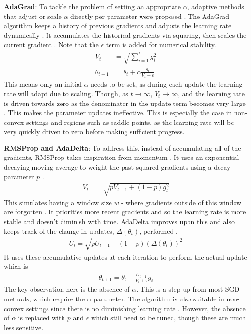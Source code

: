 \textbf{AdaGrad}: To tackle the problem of setting an appropriate $\alpha$, adaptive methods that adjust or scale $\alpha$ directly per parameter were proposed \cite{duchi2011adagrad}. The AdaGrad algorithm keeps a history of previous gradients and adjusts the learning rate dynamically \citep{duchi2011adagrad}. It accumulates the historical gradients via squaring, then scales the current gradient \citep{duchi2011adagrad}. Note that the $\epsilon$ term is added for numerical stability.
\begin{align}
    V_t &= \sqrt{\sum_{i=1}^{t} g_i^2} \\
    \theta_{t+1} &= \theta_{t} + \alpha \frac{g_t}{V_t + \epsilon}
\end{align}
This means only an initial $\alpha$ needs to be set, as during each update the learning rate will adapt due to scaling. Though, as $t \rightarrow \infty$, $V_{t} \rightarrow \infty$, and the learning rate is driven towards zero as the denominator in the update term becomes very large \citep{ruder2016overview,rmsprop2012,zeiler2012adadelta}.
This makes the parameter updates ineffective. This is especially the case in non-convex settings and regions such as saddle points, as the learning rate will be very quickly driven to zero before making sufficient progress.

\textbf{RMSProp and AdaDelta}: To address this, instead of accumulating all of the gradients, RMSProp takes inspiration from momentum \citep{ruder2016overview, rmsprop2012}. It uses an exponential decaying moving average to weight the past squared gradients using a decay parameter $p$ \citep{rmsprop2012, kingma2014adam}.
\begin{align}
    V_t &= \sqrt{p V_{t-1} + (1 - p)g_t^2} 
\end{align}
This simulates having a window size $w$ - where gradients outside of this window are forgotten \citep{rmsprop2012, kingma2014adam}. It priorities more recent gradients and so the learning rate is more stable and doesn't diminish with time. AdaDelta improves upon this and also keeps track of the change in updates, $\Delta(\theta_t)$, performed \citep{zeiler2012adadelta}.
\begin{align}
    U_t = \sqrt{p U_{t-1} + (1 - p)(\Delta(\theta_t))^2}
\end{align}
It uses these accumulative updates at each iteration to perform the actual update which is 
\begin{align}
    \theta_{t+1} = \theta_{t} - \frac{U_{t-1}}{V_{t} + \epsilon} g_t
\end{align}
The key observation here is the absence of $\alpha$. This is a step up from most SGD methods, which require the $\alpha$ parameter. The algorithm is also suitable in non-convex settings since there is no diminishing learning rate \citep{zeiler2012adadelta}. However, the absence of $\alpha$ is replaced with $p$ and $\epsilon$ which still need to be tuned, though these are much less sensitive.

